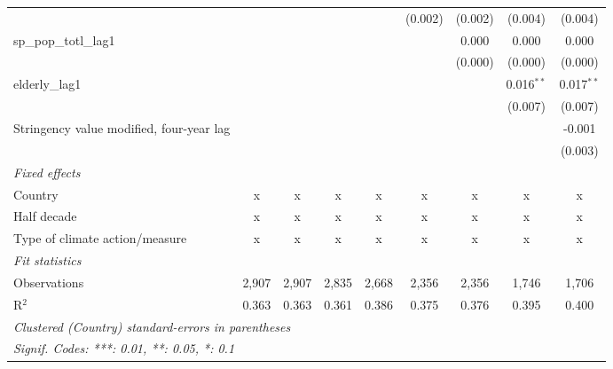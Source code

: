 \begin{tabular}{lcccccccc}
                                                                          &         &         &         &             & (0.002)     & (0.002) & (0.004)      & (0.004)\\   
   sp\_pop\_totl\_lag1                                                    &         &         &         &             &             & 0.000   & 0.000        & 0.000\\   
                                                                          &         &         &         &             &             & (0.000) & (0.000)      & (0.000)\\   
   elderly\_lag1                                                          &         &         &         &             &             &         & 0.016$^{**}$ & 0.017$^{**}$\\   
                                                                          &         &         &         &             &             &         & (0.007)      & (0.007)\\   
   Stringency value modified, four-year lag                               &         &         &         &             &             &         &              & -0.001\\   
                                                                          &         &         &         &             &             &         &              & (0.003)\\   
   \emph{Fixed effects}\\
   Country                                                                & x       & x       & x       & x           & x           & x       & x            & x\\  
   Half decade                                                            & x       & x       & x       & x           & x           & x       & x            & x\\  
   Type of climate action/measure                                         & x       & x       & x       & x           & x           & x       & x            & x\\  
   \midrule \emph{Fit statistics}\\
   Observations                                                           & 2,907   & 2,907   & 2,835   & 2,668       & 2,356       & 2,356   & 1,746        & 1,706\\  
   R$^2$                                                                  & 0.363   & 0.363   & 0.361   & 0.386       & 0.375       & 0.376   & 0.395        & 0.400\\  
   \midrule
   \multicolumn{9}{l}{\emph{Clustered (Country) standard-errors in parentheses}}\\
   \multicolumn{9}{l}{\emph{Signif. Codes: ***: 0.01, **: 0.05, *: 0.1}}\\
\end{tabular}
\par\endgroup


